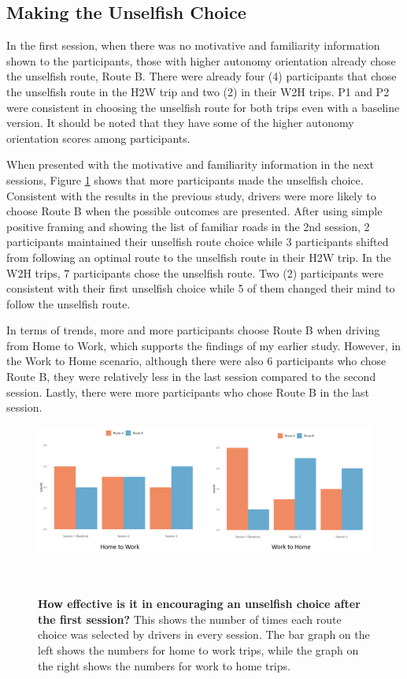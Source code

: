\subsection{Making the Unselfish Choice}
In the first session, when there was no motivative and familiarity information shown to the participants, those with higher autonomy orientation already chose the unselfish route, Route B. There were already four (4) participants that chose the unselfish route in the H2W trip and two (2) in their W2H trips. P1 and P2 were consistent in choosing the unselfish route for both trips even with a baseline version. It should be noted that they have some of the higher autonomy orientation scores among participants. 

When presented with the motivative and familiarity information in the next sessions, Figure \ref{fig:s4-unselfish-result} shows that more participants made the unselfish choice. Consistent with the results in the previous study, drivers were more likely to choose Route B when the possible outcomes are presented. After using simple positive framing and showing the list of familiar roads in the 2nd session, 2 participants maintained their unselfish route choice while 3 participants shifted from following an optimal route to the unselfish route in their H2W trip. In the W2H trips, 7 participants chose the unselfish route. Two (2) participants were consistent with their first unselfish choice while 5 of them changed their mind to follow the unselfish route. 

In terms of trends, more and more participants choose Route B when driving from Home to Work, which supports the findings of my earlier study. However, in the Work to Home scenario, although there were also 6 participants who chose Route B, they were relatively less in the last session compared to the second session. Lastly, there were more participants who chose Route B in the last session.  

\begin{figure}[t]
\centering
  \includegraphics[scale=.45]{figures/s4-unselfish-result.png}
  \caption{\textbf{How effective is it in encouraging an unselfish choice after the first session?} This shows the number of times each route choice was selected by drivers in every session. The bar graph on the left shows the numbers for home to work trips, while the graph on the right shows the numbers for work to home trips.}~\label{fig:s4-unselfish-result}
\end{figure}

